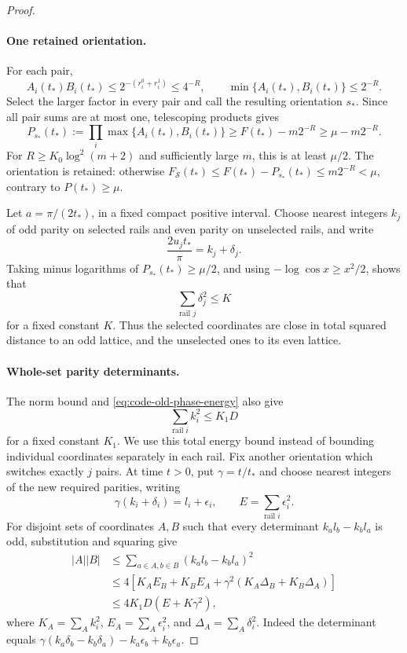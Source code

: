 \begin{proof}
\paragraph{One retained orientation.}
For each pair,
\[
 A_i(t_*)B_i(t_*)\le2^{-(r_i^0+r_i^1)}\le4^{-R},
 \qquad \min\{A_i(t_*),B_i(t_*)\}\le2^{-R}.
\]
Select the larger factor in every pair and call the resulting orientation
$s_*$. Since all pair sums are at most one, telescoping products gives
\[
 P_{s_*}(t_*):=\prod_i\max\{A_i(t_*),B_i(t_*)\}
 \ge F(t_*)-m2^{-R}\ge\mu-m2^{-R}.
\]
For $R\ge K_0\log^2(m+2)$ and sufficiently large $m$, this is at least $\mu/2$.
The orientation is retained: otherwise
$F_{\mathcal S}(t_*)\le F(t_*)-P_{s_*}(t_*)\le m2^{-R}<\mu$,
contrary to $P(t_*)\ge\mu$.

Let $a=\pi/(2t_*)$, in a fixed compact positive interval. Choose nearest
integers $k_j$ of odd parity on selected rails and even parity on
unselected rails, and write
\[
 \frac{2u_jt_*}{\pi}=k_j+\delta_j.
\]
Taking minus logarithms of $P_{s_*}(t_*)\ge\mu/2$, and using
$-\log\cos x\ge x^2/2$, shows that
\begin{equation}\label{eq:code-old-phase-energy}
 \sum_{\text{rail }j}\delta_j^2\le K
\end{equation}
for a fixed constant $K$. Thus the selected coordinates are close in
total squared distance to an odd lattice, and the unselected ones to
its even lattice.

\paragraph{Whole-set parity determinants.}
The norm bound and \eqref{eq:code-old-phase-energy} also give
\[
 \sum_{\text{rail }i}k_i^2\le K_1D
\]
for a fixed constant $K_1$. We use this total energy bound instead of
bounding individual coordinates separately in each rail.
Fix another orientation which switches exactly $j$ pairs. At time
$t>0$, put $\gamma=t/t_*$ and choose nearest integers of the new
required parities, writing
\[
 \gamma(k_i+\delta_i)=l_i+\epsilon_i,\qquad
 E=\sum_{\text{rail }i}\epsilon_i^2.
\]
For disjoint sets of coordinates $A,B$ such that every determinant
$k_a l_b-k_b l_a$ is odd, substitution and squaring give
\begin{align*}
 |A||B|&\le\sum_{a\in A,b\in B}(k_a l_b-k_b l_a)^2\\
 &\le4\left[K_AE_B+K_BE_A+
       \gamma^2(K_A\Delta_B+K_B\Delta_A)\right]\\
 &\le4K_1D(E+K\gamma^2),
\end{align*}
where $K_A=\sum_Ak_i^2$, $E_A=\sum_A\epsilon_i^2$, and
$\Delta_A=\sum_A\delta_i^2$.
Indeed the determinant equals
$\gamma(k_a\delta_b-k_b\delta_a)-k_a\epsilon_b+k_b\epsilon_a$.


\end{proof}
